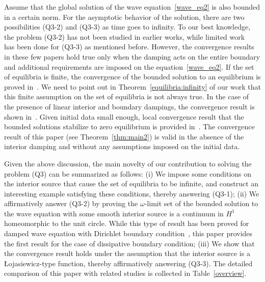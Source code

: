 \documentclass{elsarticle}
\begin{document}
Assume that the global solution of the wave equation~\eqref{wave_eq2} is also bounded in a certain norm. For the asymptotic behavior of the solution, there are two possibilities (Q3-2) and (Q3-3) as time goes to infinity. To our best knowledge, the problem (Q3-2) has not been studied in earlier works, while limited work~\cite{CEL2002, CEL2004, chueshov2004, Hao2006, Jiao2018} has been done for (Q3-3) as mentioned before. However, the convergence results in these few papers hold true only when the damping acts on the entire boundary and additional requirements are imposed on the equation~\eqref{wave_eq2}.
If the set of equilibria is finite, the convergence of the bounded solution to an equilibrium is proved in~\cite{CEL2002, CEL2004, chueshov2004}. We need to point out in Theorem~\ref{equilibria:infinity} of our work that this finite assumption on the set of equilibria is not always true. In the case of the presence of linear interior and boundary dampings, the convergence result is shown in~\cite{Hao2006}. Given initial data small enough, local convergence result that the bounded solutions stabilize to zero equilibrium is provided in~\cite{Jiao2018}. The convergence result of this paper (see Theorem~\ref{thm:main2}) is valid in the absence of the interior damping and without any assumptions imposed on the initial data.
 
Given the above discussion, the main novelty of our contribution to solving the problem (Q3) can be summarized as follows: 
(i) We impose some conditions on the interior source that cause the set of equilibria to be infinite, and construct an interesting example satisfying these conditions, thereby answering (Q3-1);
(ii) We affirmatively answer (Q3-2) by proving the $\omega$-limit set of the bounded solution to the wave equation with some smooth interior source is a continuum in $H^1$ homeomorphic to the unit circle. While this type of result has been proved for damped wave equation with Dirichlet boundary condition~\cite{jendoubi2003non}, this paper provides the first result for the case of dissipative boundary condition;
(iii) We show that the convergence result holds under the assumption that the interior source is a {\L}ojasiewicz-type function, thereby affirmatively answering (Q3-3).
The detailed comparison of this paper with related studies is collected in Table~\ref{overview}.
\end{document}

